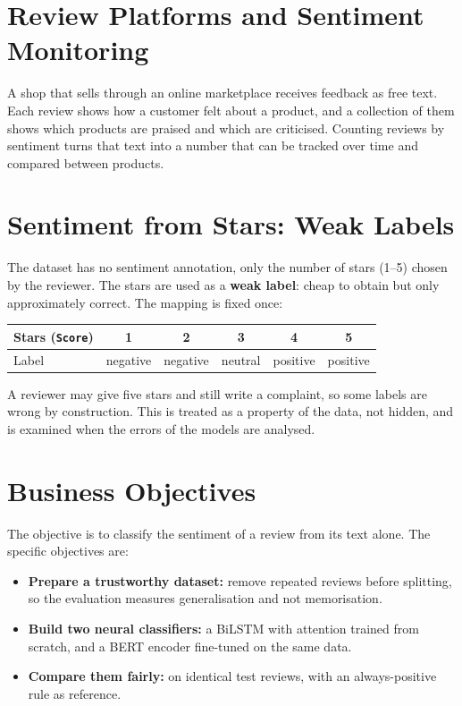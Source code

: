 \section{Review Platforms and Sentiment Monitoring}
\label{sec:2-1}

A shop that sells through an online marketplace receives feedback as free text. Each review shows how a customer felt about a product, and a collection of them shows which products are praised and which are criticised. Counting reviews by sentiment turns that text into a number that can be tracked over time and compared between products.

\section{Sentiment from Stars: Weak Labels}
\label{sec:2-2}

The dataset has no sentiment annotation, only the number of stars (1--5) chosen by the reviewer. The stars are used as a \textbf{weak label}: cheap to obtain but only approximately correct. The mapping is fixed once:

\begin{center}
\begin{tabular}{@{}lccccc@{}}
    \toprule
    Stars (\texttt{Score}) & 1 & 2 & 3 & 4 & 5 \\
    \midrule
    Label & negative & negative & neutral & positive & positive \\
    \bottomrule
\end{tabular}
\end{center}

A reviewer may give five stars and still write a complaint, so some labels are wrong by construction. This is treated as a property of the data, not hidden, and is examined when the errors of the models are analysed.

\section{Business Objectives}
\label{sec:2-3}

The objective is to classify the sentiment of a review from its text alone. The specific objectives are:

\begin{itemize}
    \item \textbf{Prepare a trustworthy dataset:} remove repeated reviews before splitting, so the evaluation measures generalisation and not memorisation.
    \item \textbf{Build two neural classifiers:} a BiLSTM with attention trained from scratch, and a BERT encoder fine-tuned on the same data.
    \item \textbf{Compare them fairly:} on identical test reviews, with an always-positive rule as reference.
\end{itemize}


